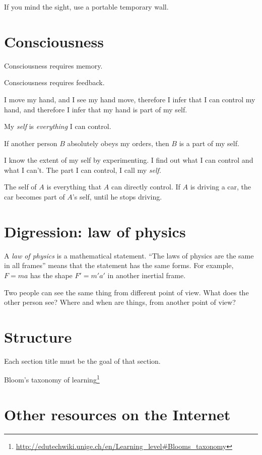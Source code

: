 If you mind the sight, use a portable temporary wall.

\section{Consciousness}

Consciousness requires memory.

Consciousness requires feedback.

I move my hand, and I see my hand move,
therefore I infer that I can control my hand,
and therefore I infer that my hand is part of my self.

My \emph{self} is \emph{everything} I can control.

If another person \(B\) absolutely obeys my orders,
then \(B\) is a part of my self.

I know the extent of my self by experimenting.
I find out what I can control and what I can't.
The part I can control, I call my \emph{self}.

The self of \(A\) is everything that \(A\) can directly control.
If \(A\) is driving a car, the car becomes part of \(A\)'s self, until he stops driving.

\section{Digression: law of physics}

A \emph{law of physics} is a mathematical statement.
\enquote{The laws of physics are the same in all frames} means that the statement has the same forms.
For example, \(F = m a\) has the shape \(F' = m' a'\) in another inertial frame.

Two people can see the same thing from different point of view.
What does the other person see?
Where and when are things, from another point of view?

\section{Structure}

Each section title must be the goal of that section.

Bloom's taxonomy of learning\footnote{\url{http://edutechwiki.unige.ch/en/Learning_level\#Blooms_taxonomy}}

\section{Other resources on the Internet}

